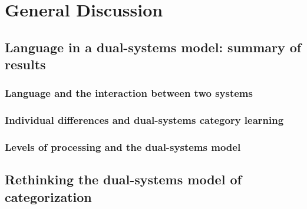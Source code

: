 \documentclass[../dissertation.tex]{subfiles}
\begin{document}
\section{General Discussion}

\subsection{Language in a dual-systems model: summary of results}
\subsubsection{Language and the interaction between two systems}

\subsubsection{Individual differences and dual-systems category learning}

\subsubsection{Levels of processing and the dual-systems model}

\subsection{Rethinking the dual-systems model of categorization}
\end{document}
